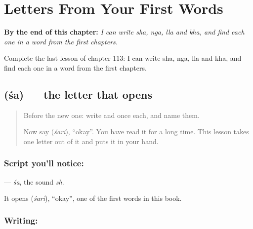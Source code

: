 
\chapter{Letters From Your First Words}
\label{ch:ml-letters-first-words}

\begin{chapteropening}
\textbf{By the end of this chapter:} \emph{I can write sha, nga, lla and kha, and find each one in a word from the first chapters.}

Complete the last lesson of chapter 113: I can write sha, nga, lla and kha, and find each one in a word from the first chapters.
\end{chapteropening}

\section[\texorpdfstring{\ml{ശ} (śa)}{ശ (śa)}]{ (śa) — the letter that opens }

\label{lesson:ML-W113-sha}



\begin{quote}
Before the new one: write  and  once each, and name them.

Now say \textbf{} (\emph{śari}), \textquotedblleft{}okay\textquotedblright{}. You have read it for a long time. This lesson takes one letter out of it and puts it in your hand.
\end{quote}

\subsection*{Script you'll notice: }
\textbf{} — \emph{śa}, the sound \emph{sh}.

It opens \textbf{} (\emph{śari}), \textquotedblleft{}okay\textquotedblright{}, one of the first words in this book.

\subsection*{Writing: }

